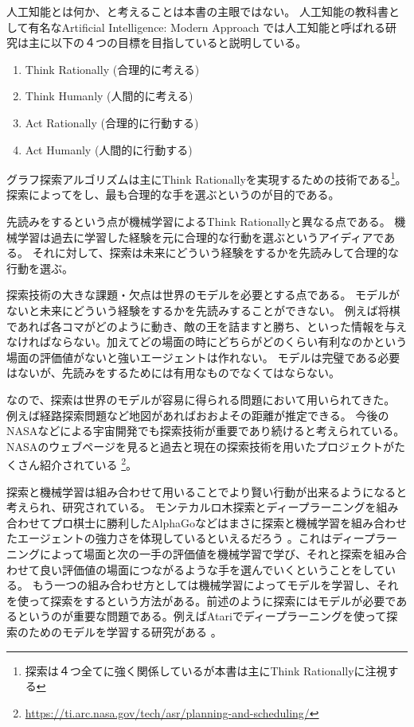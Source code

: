 人工知能とは何か、と考えることは本書の主眼ではない。
人工知能の教科書として有名なArtificial Intelligence: Modern Approach \cite{russelln03}では人工知能と呼ばれる研究は主に以下の４つの目標を目指していると説明している。

\begin{mdframed}[backgroundcolor=gray!10, roundcorner=10pt]
\begin{enumerate}
\item Think Rationally (合理的に考える)
\item Think Humanly (人間的に考える)
\item Act Rationally (合理的に行動する)
\item Act Humanly (人間的に行動する)
\end{enumerate}
\end{mdframed}

グラフ探索アルゴリズムは主にThink Rationallyを実現するための技術である\footnote{探索は４つ全てに強く関係しているが本書は主にThink Rationallyに注視する}。
探索によってをし、最も合理的な手を選ぶというのが目的である。

先読みをするという点が機械学習によるThink Rationallyと異なる点である。
機械学習は過去に学習した経験を元に合理的な行動を選ぶというアイディアである。
それに対して、探索は未来にどういう経験をするかを先読みして合理的な行動を選ぶ。

探索技術の大きな課題・欠点は世界のモデルを必要とする点である。
モデルがないと未来にどういう経験をするかを先読みすることができない。
例えば将棋であれば各コマがどのように動き、敵の王を詰ますと勝ち、といった情報を与えなければならない。加えてどの場面の時にどちらがどのくらい有利なのかという場面の評価値がないと強いエージェントは作れない。
モデルは完璧である必要はないが、先読みをするためには有用なものでなくてはならない。

なので、探索は世界のモデルが容易に得られる問題において用いられてきた。
例えば経路探索問題など地図があればおおよその距離が推定できる。
今後のNASAなどによる宇宙開発でも探索技術が重要であり続けると考えられている。NASAのウェブページを見ると過去と現在の探索技術を用いたプロジェクトがたくさん紹介されている \footnote{\url{https://ti.arc.nasa.gov/tech/asr/planning-and-scheduling/}}。


探索と機械学習は組み合わせて用いることでより賢い行動が出来るようになると考えられ、研究されている。
モンテカルロ木探索とディープラーニングを組み合わせてプロ棋士に勝利したAlphaGoなどはまさに探索と機械学習を組み合わせたエージェントの強力さを体現しているといえるだろう \cite{silver2016mastering}。これはディープラーニングによって場面と次の一手の評価値を機械学習で学び、それと探索を組み合わせて良い評価値の場面につながるような手を選んでいくということをしている。
もう一つの組み合わせ方としては機械学習によってモデルを学習し、それを使って探索をするという方法がある。前述のように探索にはモデルが必要であるというのが重要な問題である。例えばAtariでディープラーニングを使って探索のためのモデルを学習する研究がある \cite{oh2015action,silver2016predictron,chiappa2017recurrent}。

